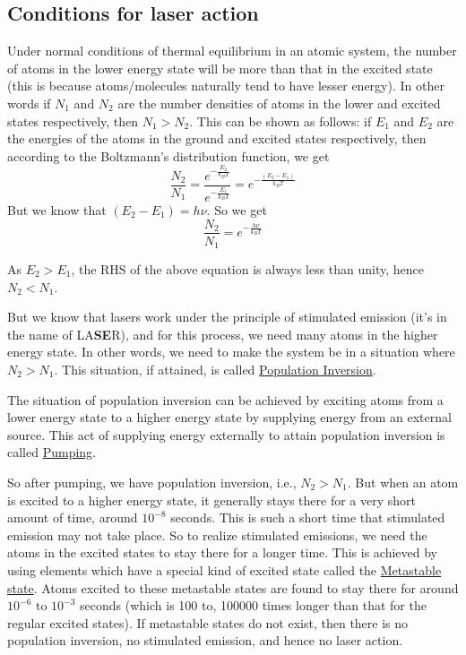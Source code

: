 \documentclass[12pt]{article}
\begin{document}
\subsection{Conditions for laser action}
Under normal conditions of thermal equilibrium in an atomic system, the number of atoms in the lower energy state will be more than that in the excited state (this is because atoms/molecules naturally tend to have lesser energy). In other words if \(N_1\) and \(N_2\) are the number densities of atoms in the lower and excited states respectively, then \(N_1 > N_2\). This can be shown as follows: if \(E_1\) and \(E_2\) are the energies of the atoms in the ground and excited states respectively, then according to the Boltzmann’s distribution function, we get
\[\frac{N_2}{N_1}=\frac{e^{-\frac{E_2}{k_BT}}}{e^{-\frac{E_1}{k_BT}}}=e^{-\frac{(E_2-E_1)}{k_BT}}\]
But we know that \((E_2-E_1)=h\nu\). So we get
\[\frac{N_2}{N_1}=e^{-\frac{h\nu}{k_BT}}\]

As \(E_2>E_1\), the RHS of the above equation is always less than unity, hence \(N_2 < N_1\).

But we know that lasers work under the principle of stimulated emission (it's in the name of LA\textbf{SE}R), and for this process, we need many atoms in the higher energy state. In other words, we need to make the system be in a situation where \(N_2 > N_1\). This situation, if attained, is called \underline{Population Inversion}.

The situation of population inversion can be achieved by exciting atoms from a lower energy state to a higher energy state by supplying energy from an external source. This act of supplying energy externally to attain population inversion is called \underline{Pumping}.

So after pumping, we have population inversion, i.e., \(N_2 > N_1\). But when an atom is excited to a higher energy state, it generally stays there for a very short amount of time, around \(10^{-8}\) seconds. This is such a short time that stimulated emission may not take place. So to realize stimulated emissions, we need the atoms in the excited states to stay there for a longer time. This is achieved by using elements which have a special kind of excited state called the \underline{Metastable state}. Atoms excited to these metastable states are found to stay there for around \(10^{-6} \text{ to } 10^{-3}\) seconds (which is 100 to, 100000 times longer than that for the regular excited states). If metastable states do not exist, then there is no population inversion, no stimulated emission, and hence no laser action.
\end{document}
